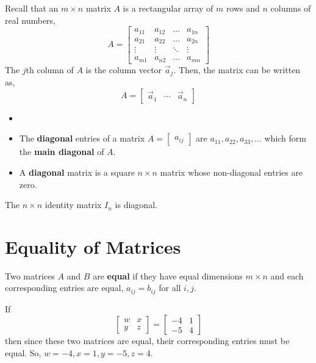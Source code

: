 \documentclass[letterpaper,12pt]{article}
\begin{document}
Recall that an $m \times n$ matrix $A$ is a rectangular array of $m$ rows and $n$ columns of real numbers,
\begin{equation*}
    A = \begin{bmatrix}
    a_{11} & a_{12} & \dots & a_{1n} \\
    a_{21} & a_{22} & \dots & a_{2n} \\
    \vdots & \vdots & \ddots & \vdots \\
    a_{m1} & a_{n2} & \dots & a_{mn}
    \end{bmatrix}
\end{equation*}
The $j$th column of $A$ is the column vector $\vec{a}_j$. Then, the matrix can be written as,
\begin{equation*}
    A = \begin{bmatrix} \vec{a}_1 & \cdots & \vec{a}_n \end{bmatrix}
\end{equation*}

\begin{definition}
\begin{itemize}
    \item[]
    \item The \textbf{diagonal} entries of a matrix $A = \begin{bmatrix} a_{ij} \end{bmatrix}$ are $a_{11}, a_{22}, a_{33}, \dots$ which form the \textbf{main diagonal} of $A$.
    \item A \textbf{diagonal} matrix is a square $n \times n$ matrix whose non-diagonal entries are zero.
\end{itemize}
\end{definition}

\begin{example}
The $n \times n$ identity matrix $I_n$ is diagonal.
\end{example}

\section*{Equality of Matrices}
\begin{definition}
Two matrices $A$ and $B$ are \textbf{equal} if they have equal dimensions $m \times n$ and each corresponding entries are equal, $a_{ij} = b_{ij}$ for all $i, j$.
\end{definition}

\begin{example}
If
\begin{equation*}
    \begin{bmatrix} w & x \\ y & z \end{bmatrix} = \begin{bmatrix} -4 & 1 \\ -5 & 4 \end{bmatrix}
\end{equation*}
then since these two matrices are equal, their corresponding entries must be equal. So, $w = -4, x = 1, y = -5, z = 4$.
\end{example}
\end{document}
